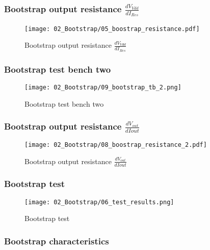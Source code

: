 \documentclass[xcolor=dvipsnames,envcountsect]{beamer}
\begin{document}
\begin{frame}
	\frametitle{Bootstrap output resistance $\frac{dV_{Vdd}}{dI_{Res}}$}
	\begin{figure}[ht]
		\centering
		\texttt{[image: 02\_Bootstrap/05\_boostrap\_resistance.pdf]}
		\caption{Bootstrap output resistance $\frac{dV_{Vdd}}{dI_{Res}}$}
	\end{figure}
\end{frame}

\begin{frame}
	\frametitle{Bootstrap test bench two}
	\begin{figure}[ht]
		\centering
		\texttt{[image: 02\_Bootstrap/09\_bootstrap\_tb\_2.png]}
		\caption{Bootstrap test bench two}
	\end{figure}
\end{frame}
\begin{frame}
	\frametitle{Bootstrap output resistance $\frac{dV_{out}}{dI{out}}$}
	\begin{figure}[ht]
		\centering
		\texttt{[image: 02\_Bootstrap/08\_boostrap\_resistance\_2.pdf]}
		\caption{Bootstrap output resistance $\frac{dV_{out}}{dI{out}}$}
	\end{figure}
\end{frame}



\begin{frame}
	\frametitle{Bootstrap test}
	\begin{figure}[ht]
		\centering
		\texttt{[image: 02\_Bootstrap/06\_test\_results.png]}
		\caption{Bootstrap test}
	\end{figure}
\end{frame}

\begin{frame}
	\frametitle{Bootstrap characteristics}
	\begin{figure}[ht]
		\centering
	\end{figure}
\end{frame}
\end{document}
